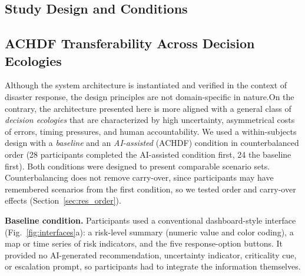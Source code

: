 \documentclass[journal]{IEEEtran}
\theoremstyle{plain}
\theoremstyle{definition}
\providecommand{\DIFaddtex}[1]{{\protect\color{blue} \sf #1}} %
\providecommand{\DIFdeltex}[1]{{\protect\color{red} \scriptsize #1}} %
\providecommand{\DIFaddbegin}{} %
\providecommand{\DIFaddend}{} %
\providecommand{\DIFdelbegin}{} %
\providecommand{\DIFdelend}{} %
\providecommand{\DIFadd}[1]{\texorpdfstring{\DIFaddtex{#1}}{#1}} %
\providecommand{\DIFdel}[1]{\texorpdfstring{\DIFdeltex{#1}}{}} %
\newcommand{\DIFscaledelfig}{0.5}
\newlength{\DIFdelgraphicswidth} %
\newlength{\DIFdelgraphicsheight} %
\newcommand{\DIFaddincludegraphics}[2][]{{\color{blue}\fbox{\DIFOincludegraphics[#1]{#2}}}} %
\newcommand{\DIFdelincludegraphics}[2][]{%
\sbox{\DIFdelgraphicsbox}{\DIFOincludegraphics[#1]{#2}}%
\settoboxwidth{\DIFdelgraphicswidth}{\DIFdelgraphicsbox} %
\settoboxtotalheight{\DIFdelgraphicsheight}{\DIFdelgraphicsbox} %
\scalebox{\DIFscaledelfig}{%
\parbox[b]{\DIFdelgraphicswidth}{\usebox{\DIFdelgraphicsbox}\\[-\baselineskip] \rule{\DIFdelgraphicswidth}{0em}}\llap{\resizebox{\DIFdelgraphicswidth}{\DIFdelgraphicsheight}{%
\setlength{\unitlength}{\DIFdelgraphicswidth}%
\begin{picture}(1,1)%
\thicklines\linethickness{2pt} %
{\color[rgb]{1,0,0}\put(0,0){\framebox(1,1){}}}%
{\color[rgb]{1,0,0}\put(0,0){\line( 1,1){1}}}%
{\color[rgb]{1,0,0}\put(0,1){\line(1,-1){1}}}%
\end{picture}%
}\hspace*{3pt}}} %
} %
\DeclareRobustCommand{\DIFaddbegin}{\DIFOaddbegin \let\includegraphics\DIFaddincludegraphics} %
\DeclareRobustCommand{\DIFaddend}{\DIFOaddend \let\includegraphics\DIFOincludegraphics} %
\DeclareRobustCommand{\DIFdelbegin}{\DIFOdelbegin \let\includegraphics\DIFdelincludegraphics} %
\DeclareRobustCommand{\DIFdelend}{\DIFOaddend \let\includegraphics\DIFOincludegraphics} %
\begin{document}
\DIFdelend \DIFaddbegin \subsection{\DIFadd{Study Design and Conditions}}
\DIFaddend 

    \DIFdelbegin \subsection{\DIFdel{ACHDF Transferability Across Decision Ecologies}}
\addtocounter{subsection}{-1}%
\DIFdel{Although the system architecture is instantiated and verified in the context of disaster response, the design principles are not domain-specific in nature.On the contrary, the architecture presented here is more aligned with a general class of \emph{decision ecologies} that are characterized by high uncertainty, asymmetrical costs of errors, timing pressures, and human accountability. }\DIFdelend \DIFaddbegin \DIFadd{We used a within-subjects design with a \emph{baseline} and an \emph{AI-assisted} (ACHDF) condition in counterbalanced order (28 participants completed the AI-assisted condition first, 24 the baseline first). Both conditions were designed to present comparable scenario sets. Counterbalancing does not remove carry-over, since participants may have remembered scenarios from the first condition, so we tested order and carry-over effects (Section~\ref{sec:res_order}).
}

    \DIFadd{\textbf{Baseline condition.} Participants used a conventional dashboard-style interface (Fig.~\ref{fig:interfaces}a): a risk-level summary (numeric value and color coding), a map or time series of risk indicators, and the five response-option buttons. It provided no AI-generated recommendation, uncertainty indicator, criticality cue, or escalation prompt, so participants had to integrate the information themselves.
}
\end{document}
